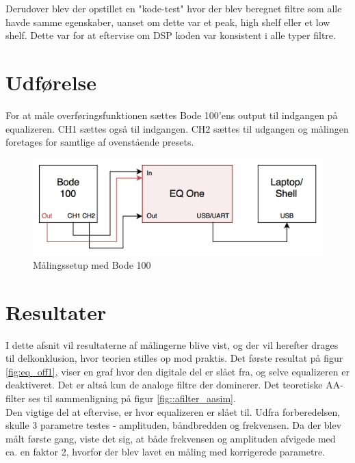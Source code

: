 Derudover blev der opstillet en "kode-test" hvor der blev beregnet filtre som alle havde samme egenskaber, uanset om dette var et peak, high shelf eller et low shelf. Dette var for at eftervise om DSP koden var konsistent i alle typer filtre. \\

\section{Udførelse}
For at måle overføringsfunktionen sættes Bode 100'ens output til indgangen på equalizeren. CH1 sættes også til indgangen. CH2 sættes til udgangen og målingen foretages for samtlige af ovenstående presets. \\


\begin{figure}[h!]\label{fig:bode_setup}
	\centering
	\includegraphics[width=13cm]{billeder/bode_setup}
	\caption{Målingssetup med Bode 100}
\end{figure}	

\FloatBlock

\section{Resultater}
I dette afsnit vil resultaterne af målingerne blive vist, og der vil herefter drages til delkonklusion, hvor teorien stilles op mod praktis.
Det første resultat på figur \ref{fig:eq_off1}, viser en graf hvor den digitale del er slået fra, og selve equalizeren er deaktiveret. Det er altså kun de analoge filtre der dominerer. Det teoretiske AA-filter ses til sammenligning på figur \ref{fig::afilter_aasim}. \\
Den vigtige del at eftervise, er hvor equalizeren er slået til. 
Udfra forberedelsen, skulle 3 parametre testes - amplituden, båndbredden og frekvensen. 
Da der blev målt første gang, viste det sig, at både frekvensen og amplituden afvigede med ca. en faktor 2, hvorfor der blev lavet en måling med korrigerede parametre. \\


